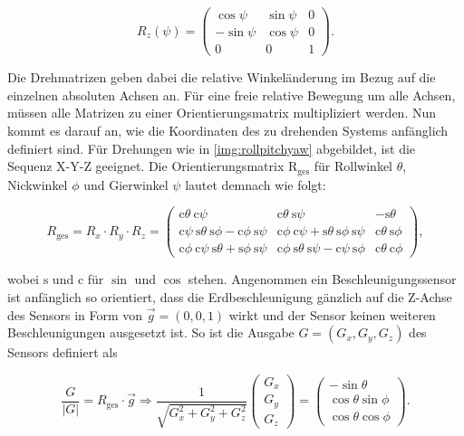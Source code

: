 	\begin{equation}
		R_z(\psi) = 
		\begin{pmatrix}
			\cos{\psi} & \sin{\psi} & 0\\
			-\sin{\psi} & \cos{\psi} & 0\\
			0 & 0 & 1
		\end{pmatrix}.
		\label{eqn:drehmatrix-z}
	\end{equation}
	
	Die Drehmatrizen geben dabei die relative Winkeländerung im Bezug auf die einzelnen absoluten Achsen an. Für eine freie relative Bewegung um alle Achsen, müssen alle Matrizen zu einer Orientierungsmatrix multipliziert werden. Nun kommt es darauf an, wie die Koordinaten des zu drehenden Systems anfänglich definiert sind. Für Drehungen wie in \ref{img:rollpitchyaw} abgebildet, ist die Sequenz X-Y-Z geeignet. Die Orientierungsmatrix R$_\text{ges}$ für Rollwinkel $\theta$, Nickwinkel $\phi$ und Gierwinkel $\psi$ lautet demnach wie folgt:
		
	\begin{equation}
		R_\text{ges} = R_x \cdot R_y \cdot R_z = 
		\begin{pmatrix}
			\text{c}\theta~\text{c}\psi & \text{c}\theta~\text{s}\psi & -\text{s}\theta\\
			\text{c}\psi~\text{s}\theta~\text{s}\phi - \text{c}\phi~\text{s}\psi & \text{c}\phi~\text{c}\psi + \text{s}\theta~\text{s}\phi~\text{s}\psi & \text{c}\theta~\text{s}\phi\\
			\text{c}\phi~\text{c}\psi~\text{s}\theta + \text{s}\phi~\text{s}\psi & \text{c}\phi~\text{s}\theta~\text{s}\psi - \text{c}\psi~\text{s}\phi & \text{c}\theta~\text{c}\phi
		\end{pmatrix},
		\label{eqn:orientierungsmatrix}
	\end{equation}
	
	wobei $\text{s}$ und $\text{c}$ für $\sin$ und $\cos$ stehen\cite{rui-zhang}. Angenommen ein Beschleunigungssensor ist anfänglich so orientiert, dass die Erdbeschleunigung gänzlich auf die Z-Achse des Sensors in Form von $\Vec{g} = (0,0,1)$ wirkt und der Sensor keinen weiteren Beschleunigungen ausgesetzt ist. So ist die Ausgabe $G = (G_x, G_y, G_z)$ des Sensors definiert als
	
	\begin{equation}
		\frac{G}{|G|} = R_\text{ges} \cdot \Vec{g} \Rightarrow
		\frac{1}{\sqrt{G_x^2 + G_y^2 + G_z^2}}
		\begin{pmatrix}
		G_x\\
		G_y\\
		G_z
		\end{pmatrix} =
		\begin{pmatrix}
			-\sin{\theta}\\
			\cos{\theta}\sin{\phi}\\
			\cos{\theta}\cos{\phi}
		\end{pmatrix}.
	\end{equation}
	
